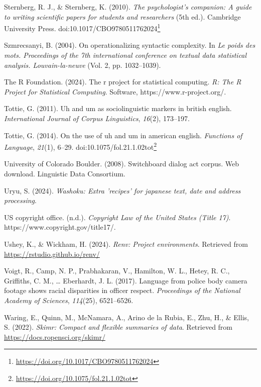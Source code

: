 \documentclass[
  letterpaper,
]{latex/krantz}
\newlength{\cslhangindent}
\newenvironment{CSLReferences}[2] %
 {\begin{list}{}{%
  \setlength{\itemindent}{0pt}
  \setlength{\leftmargin}{0pt}
  \setlength{\parsep}{0pt}
  \ifodd #1
   \setlength{\leftmargin}{\cslhangindent}
   \setlength{\itemindent}{-1\cslhangindent}
  \fi
  \setlength{\itemsep}{#2\baselineskip}}}
 {\end{list}}
\theoremstyle{definition}
\theoremstyle{remark}
\DeclareRobustCommand{\href}[2]{#2\footnote{\url{#1}}}
\begin{document}
\begin{CSLReferences}{1}{0}
Sternberg, R. J., \& Sternberg, K. (2010). \emph{The psychologist's
companion: A guide to writing scientific papers for students and
researchers} (5th ed.). Cambridge University Press.
doi:\href{https://doi.org/10.1017/CBO9780511762024}{10.1017/CBO9780511762024}

Szmrecsanyi, B. (2004). On operationalizing syntactic complexity. In
\emph{Le poids des mots. Proceedings of the 7th international conference
on textual data statistical analysis. Louvain-la-neuve} (Vol. 2, pp.
1032--1039).

The R Foundation. (2024). The r project for statistical computing.
\emph{R: The R Project for Statistical Computing}. Software,
https://www.r-project.org/.

Tottie, G. (2011). Uh and um as sociolinguistic markers in british
english. \emph{International Journal of Corpus Linguistics},
\emph{16}(2), 173--197.

Tottie, G. (2014). On the use of uh and um in american english.
\emph{Functions of Language}, \emph{21}(1), 6--29.
doi:\href{https://doi.org/10.1075/fol.21.1.02tot}{10.1075/fol.21.1.02tot}

University of Colorado Boulder. (2008). Switchboard dialog act corpus.
Web download. Linguistic Data Consortium.

Uryu, S. (2024). \emph{Washoku: Extra 'recipes' for japanese text, date
and address processing}.

US copyright office. (n.d.). \emph{Copyright Law of the United States
(Title 17)}. https://www.copyright.gov/title17/.

Ushey, K., \& Wickham, H. (2024). \emph{Renv: Project environments}.
Retrieved from \url{https://rstudio.github.io/renv/}

Voigt, R., Camp, N. P., Prabhakaran, V., Hamilton, W. L., Hetey, R. C.,
Griffiths, C. M., \ldots{} Eberhardt, J. L. (2017). Language from police
body camera footage shows racial disparities in officer respect.
\emph{Proceedings of the National Academy of Sciences}, \emph{114}(25),
6521--6526.

Waring, E., Quinn, M., McNamara, A., Arino de la Rubia, E., Zhu, H., \&
Ellis, S. (2022). \emph{Skimr: Compact and flexible summaries of data}.
Retrieved from \url{https://docs.ropensci.org/skimr/}


\end{CSLReferences}
\end{document}
